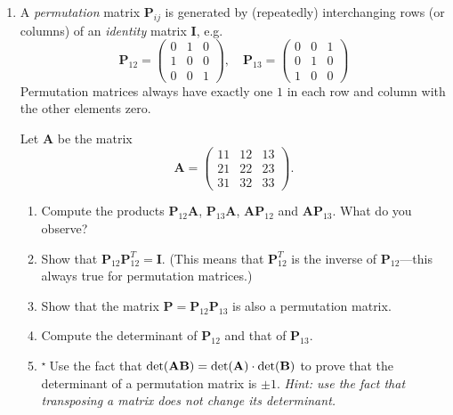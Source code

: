 \documentclass[11pt,a4paper]{article}
\def\bA{\mathbf{A}}
\def\bB{\mathbf{B}}
\def\bI{\mathbf{I}}
\def\bP{\mathbf{P}}
\def\tough{$\!\!\!{}^\star\>$}
\begin{document}
\begin{enumerate}
{\begin{enumerate}
\end{enumerate}
\noindent\hrulefill	

}{}%
\item\label{qdjsp1}
A {\it permutation} matrix  $\bP_{ij}$ is generated by (repeatedly) interchanging rows (or columns) 
of an {\it identity} matrix $\bI$, e.g.
$$  \bP_{12} =  \left ( \begin{array}{ccc}  0 & 1 & 0\\  1 & 0 & 0\\  0 & 0 & 1 \end{array} \right ),  \quad
  \bP_{13} =  \left ( \begin{array}{ccc}  0 & 0 & 1\\  0 & 1 & 0\\  1 & 0 & 0 \end{array} \right )  $$
Permutation matrices always have exactly one $1$ in each row and column with the other elements zero.

Let $\bA$ be the matrix
$$  \bA =  \left ( \begin{array}{ccc}  11 & 12 & 13\\  21 & 22 & 23 \\  31 & 32 & 33 \end{array} \right ).$$
\begin{enumerate}
\item Compute the products $\bP_{12} \bA$,  $\bP_{13} \bA$,   $\bA\bP_{12}$ and  $\bA\bP_{13}$.
What do you observe?
\item  Show that  $\bP_{12} \bP_{12}^T = \bI$.  (This means that $\bP_{12}^T$ is the inverse of   $\bP_{12}$---this
always true for permutation matrices.)
\item Show that the matrix $\bP= \bP_{12} \bP_{13} $ is also a permutation matrix. 
\item Compute  the determinant of $\bP_{12}$ and that of $\bP_{13}$.
\item\tough Use the fact that  $\hbox{det}(\bA \bB) =  \hbox{det}(\bA) \cdot \hbox{det}(\bB)$ to
prove that the determinant of a permutation matrix is $\pm 1$. \emph{Hint: 
use the fact that transposing a matrix does not change its determinant.}


\end{enumerate}
\end{enumerate}
\end{document}
